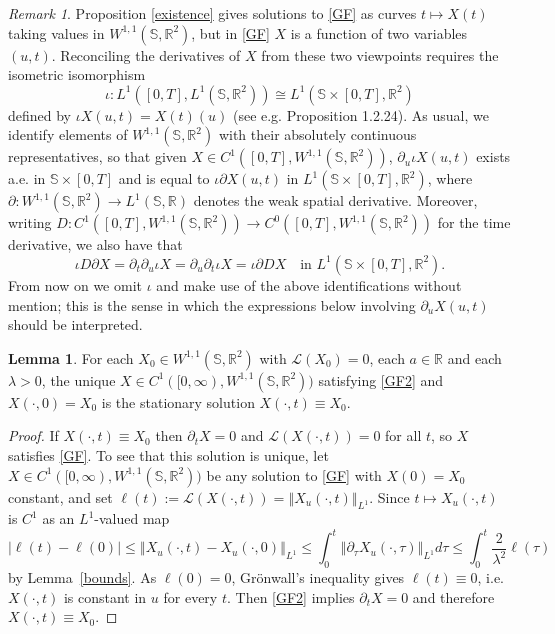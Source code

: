 \documentclass[a4paper,11pt]{amsart}
\theoremstyle{definition}\newtheorem*{definition}{Definition}
\theoremstyle{definition} \newtheorem{proposition}[theorem]{Proposition}
\theoremstyle{definition}\newtheorem{lemma}[theorem]{Lemma}
\theoremstyle{definition}\newtheorem{corollary}[theorem]{Corollary}
\theoremstyle{definition}\newtheorem{example}{Example}
\theoremstyle{remark}\newtheorem*{remark}{Remark}
\def\R{\mathbb{R}}
\def\S{\mathbb{S}}
\newcommand{\norm}[1]{{\left \Vert {#1}\right \Vert}}
\newcommand{\abs}[1]{\left | {#1}\right |}
\def\length{\mathcal L}
\def\wsr{W^{1,1}(\S,\R^2)}
\begin{document}
\begin{remark}
Proposition \ref{existence} gives solutions to \eqref{GF} as curves $t\mapsto X(t)$ taking values in $\wsr$, but in \eqref{GF} $X$ is a function of two variables $(u,t)$. Reconciling the derivatives of $X$ from these two viewpoints requires the isometric isomorphism 
\[  \iota:L^1([0,T],L^1(\S,\R^2))\cong L^1(\S\times [0,T],\R^2)\] defined by $\iota X(u,t)=X(t)(u)$ (see e.g. \cite{hytonen2016analysis} Proposition 1.2.24). As usual, we identify elements of $\wsr$ with their absolutely continuous representatives, so that given $X\in C^1([0,T],\wsr)$, $\partial_u \iota X(u,t)$ exists a.e. in $\S\times [0,T]$ and is equal to $\iota\partial X(u,t)$ in $L^1(\S\times [0,T],\R^2)$, where $\partial : \wsr \to L^1(\S,\R)$ denotes the weak spatial derivative. Moreover, writing $D:C^1([0,T],\wsr)\to C^0([0,T],\wsr)$ for the time derivative, we also have that 
\[
\iota D\partial X=\partial_t\partial_u\iota X=\partial_u\partial_t\iota X=\iota \partial DX \quad \text{in } L^1(\S\times [0,T],\R^2).
\]
From now on we omit $\iota$ and make use of the above identifications without mention; this is the sense in which the expressions below involving $\partial_u X(u,t)$ should be interpreted.

\end{remark}


\begin{lemma}\label{wellposedconstants}
For each $X_0\in W^{1,1}(\S,\R^2)$ with $\length(X_0)=0$, each $a\in\R$ and each $\lambda>0$, the unique $X\in C^1([0,\infty),W^{1,1}(\S,\R^2))$ satisfying \eqref{GF2} and $X(\cdot,0)= X_0$ is the stationary solution $X(\cdot, t)\equiv X_0$.
\end{lemma}
\begin{proof}
If $X(\cdot,t)\equiv X_0$ then $\partial_t X=0$ and $\length(X(\cdot,t))=0$ for all $t$, so $X$ satisfies \eqref{GF}. To see that this solution is unique, let $X\in C^1([0,\infty),W^{1,1}(\S,\R^2))$ be any solution to \eqref{GF} with $X(0)=X_0$ constant, and set 
$\ell(t):=\length(X(\cdot,t))=\norm{X_u(\cdot,t)}_{L^1}$.
Since $t\mapsto X_u(\cdot,t)$ is $C^1$ as an $L^1$-valued map 
\[
\abs{\ell(t)-\ell(0)}\leq \norm{X_u(\cdot,t)-X_u(\cdot, 0)}_{L^1}\leq \int_0^t\norm{\partial_\tau X_u(\cdot, \tau)}_{L^1}d\tau \leq \int_0^t \frac{2}{\lambda^2}\ell(\tau)
\]
by Lemma~\ref{bounds}. As $\ell(0)=0$, Gr\"onwall's inequality gives $\ell(t)\equiv 0$, i.e. $X(\cdot,t)$ is constant in $u$ for every $t$. Then \eqref{GF2} implies $\partial_tX=0$ and therefore $X(\cdot,t)\equiv X_0$.
\end{proof}
\end{document}
